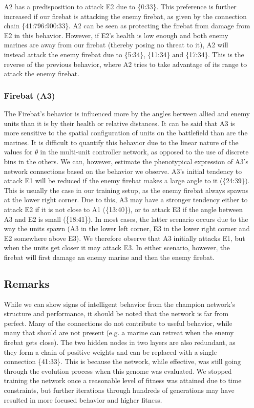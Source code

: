 \documentclass[10pt,a4paper,twocolumn]{article}
\begin{document}
A2 has a predisposition to attack E2 due to \{0:33\}. This preference is further increased if our firebat is attacking the enemy firebat, as given by the connection chain \{41:796:900:33\}. A2 can be seen as protecting the firebat from damage from E2 in this behavior. However, if E2's health is low enough and both enemy marines are away from our firebat (thereby posing no threat to it), A2 will instead attack the enemy firebat due to \{5:34\}, \{11:34\} and \{17:34\}. This is the reverse of the previous behavior, where A2 tries to take advantage of its range to attack the enemy firebat.

\subsubsection{Firebat (A3)}

The Firebat's behavior is influenced more by the angles between allied and enemy units than it is by their health or relative distances. It can be said that A3 is more sensitive to the spatial configuration of units on the battlefield than are the marines. It is difficult to quantify this behavior due to the linear nature of the values for $\theta$ in the multi-unit controller network, as opposed to the use of discrete bins in the others. We can, however, estimate the phenotypical expression of A3's network connections based on the behavior we observe. A3's initial tendency to attack E1 will be reduced if the enemy firebat makes a large angle to it (\{24:39\}). This is usually the case in our training setup, as the enemy firebat always spawns at the lower right corner. Due to this, A3 may have a stronger tendency either to attack E2 if it is not close to A1 (\{13:40\}), or to attack E3 if the angle between A3 and E2 is small (\{18:41\}). In most cases, the latter scenario occurs due to the way the units spawn (A3 in the lower left corner, E3 in the lower right corner and E2 somewhere above E3). We therefore observe that A3 initially attacks E1, but when the units get closer it may attack E3. In either scenario, however, the firebat will first damage an enemy marine and then the enemy firebat.

\subsection{Remarks}
\label{sec:network_remarks}

While we can show signs of intelligent behavior from the champion network's structure and performance, it should be noted that the network is far from perfect. Many of the connections do not contribute to useful behavior, while many that should are not present (e.g. a marine can retreat when the enemy firebat gets close). The two hidden nodes in two layers are also redundant, as they form a chain of positive weights and can be replaced with a single connection \{41:33\}. This is because the network, while effective, was still going through the evolution process when this genome was evaluated. We stopped training the network once a reasonable level of fitness was attained due to time constraints, but further iterations through hundreds of generations may have resulted in more focused behavior and higher fitness.
\end{document}
